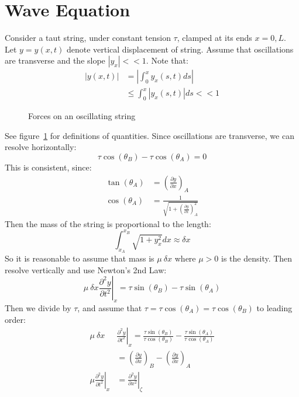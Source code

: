\documentclass[../Main.tex]{subfiles}
\begin{document}
\section{Wave Equation}
Consider a taut string, under constant tension $\tau$, clamped at its ends $x = 0, L$. Let $y = y(x, t)$ denote vertical displacement of string. Assume that oscillations are transverse and the slope $|y_x| << 1$. Note that:
\begin{align*}
    |y(x, t)| &= \left|\int_{0}^{x} y_x(s, t) ds\right| \\
    &\leq \int_{0}^{x} |y_x(s, t)| ds << 1
\end{align*}
\begin{figure}
    \centering
    \begin{tikzpicture}[scale=0.5]
    \end{tikzpicture}
    \caption{Forces on an oscillating string}
    \label{figOscString}
\end{figure}
See figure~\ref{figOscString} for definitions of quantities. Since oscillations are transverse, we can resolve horizontally:
\begin{equation*}
    \tau \cos(\theta_B) - \tau \cos(\theta_A) = 0
\end{equation*}
This is consistent, since:
\begin{align*}
    \tan(\theta_A) &= \left(\frac{\partial y}{\partial x}\right)_A \\
    \cos(\theta_A) &= \frac{1}{\sqrt{1 + \left(\frac{\partial y}{\partial x}\right)_A^2}}
\end{align*}
Then the mass of the string is proportional to the length:
\begin{equation*}
    \int_{x_A}^{x_B} \sqrt{1 + y_x^2} dx \approx \delta x
\end{equation*}
So it is reasonable to assume that mass is $\mu~\delta x$ where $\mu > 0$ is the density.
Then resolve vertically and use Newton's 2nd Law:
\begin{equation*}
    \mu~\delta x \left.\frac{\partial^{2}y}{\partial t^{2}}\right|_x = \tau\sin(\theta_B) - \tau\sin(\theta_A)
\end{equation*}
Then we divide by $\tau$, and assume that $\tau = \tau\cos(\theta_A) = \tau\cos(\theta_B)$ to leading order:
\begin{align*}
    \mu~\delta x &\left.\frac{\partial^{2}y}{\partial t^{2}}\right|_x = \frac{\tau\sin(\theta_B)}{\tau \cos(\theta_B)} - \frac{\tau\sin(\theta_A)}{\tau \cos(\theta_A)} \\
    &= \left(\frac{\partial y}{\partial x}\right)_B - \left(\frac{\partial y}{\partial x}\right)_A \\
    \mu \left.\frac{\partial^{2}y}{\partial t^{2}}\right|_x &= \left.\frac{\partial^{2}y}{\partial x^{2}} \right|_{\zeta}
\end{align*}
\end{document}
